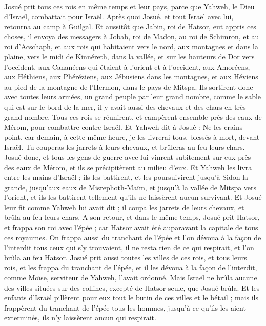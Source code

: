 \begin{multicols}{2}
Josué prit tous ces rois en même temps et leur pays, parce que Yahweh, le Dieu d'Israël, combattait pour Israël.
Après quoi Josué, et tout Israël avec lui, retourna au camp à Guilgal.
\VerseOne{}Et aussitôt que Jabin, roi de Hatsor, eut appris ces choses, il envoya des messagers à Jobab, roi de Madon, au roi de Schimron, et au roi d'Acschaph,
et aux rois qui habitaient vers le nord, aux montagnes et dans la plaine, vers le midi de Kinnéreth, dans la vallée, et sur les hauteurs de Dor vers l'occident,
aux Cananéens qui étaient à l'orient et à l'occident, aux Amoréens, aux Héthiens, aux Phéréziens, aux Jébusiens dans les montagnes, et aux Héviens au pied de la montagne de l'Hermon, dans le pays de Mitspa.
Ils sortirent donc avec toutes leurs armées, un grand peuple par leur grand nombre, comme le sable qui est sur le bord de la mer, il y avait aussi des chevaux et des chars en très grand nombre.
Tous ces rois se réunirent, et campèrent ensemble près des eaux de Mérom, pour combattre contre Israël.
Et Yahweh dit à Josué : Ne les crains point, car demain, à cette même heure, je les livrerai tous, blessés à mort, devant Israël. Tu couperas les jarrets à leurs chevaux, et brûleras au feu leurs chars.
Josué donc, et tous les gens de guerre avec lui vinrent subitement sur eux près des eaux de Mérom, et ils se précipitèrent au milieu d'eux.
Et Yahweh les livra entre les mains d'Israël ; ils les battirent, et les poursuivirent jusqu'à Sidon la grande, jusqu'aux eaux de Misrephoth-Maïm, et jusqu'à la vallée de Mitspa vers l'orient, et ils les battirent tellement qu'ils ne laissèrent aucun survivant.
Et Josué leur fit comme Yahweh lui avait dit ; il coupa les jarrets de leurs chevaux, et brûla au feu leurs chars.
A son retour, et dans le même temps, Josué prit Hatsor, et frappa son roi avec l'épée ; car Hatsor avait été auparavant la capitale de tous ces royaumes.
On frappa aussi du tranchant de l'épée et l'on dévoua à la façon de l'interdit tous ceux qui s'y trouvaient, il ne resta rien de ce qui respirait, et l'on brûla au feu Hatsor.
Josué prit aussi toutes les villes de ces rois, et tous leurs rois, et les frappa du tranchant de l'épée, et il les dévoua à la façon de l'interdit, comme Moïse, serviteur de Yahweh, l'avait ordonné.
Mais Israël ne brûla aucune des villes situées sur des collines, excepté de Hatsor seule, que Josué brûla.
Et les enfants d'Israël pillèrent pour eux tout le butin de ces villes et le bétail ; mais ils frappèrent du tranchant de l'épée tous les hommes, jusqu'à ce qu'ils les aient exterminés, ils n'y laissèrent aucun qui respirait.

\end{multicols}
